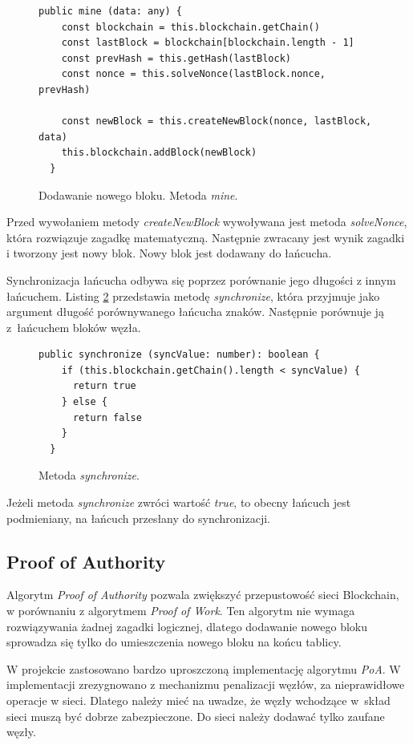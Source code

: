 \documentclass[a4paper,12pt]{book}
\begin{document}
\begin{figure}[H]  
  \centering
\begin{lstlisting}[style=ES6]
  public mine (data: any) {
    const blockchain = this.blockchain.getChain()
    const lastBlock = blockchain[blockchain.length - 1]
    const prevHash = this.getHash(lastBlock)
    const nonce = this.solveNonce(lastBlock.nonce, prevHash)

    const newBlock = this.createNewBlock(nonce, lastBlock, data)
    this.blockchain.addBlock(newBlock)
  }
\end{lstlisting}
\caption{Dodawanie nowego bloku. Metoda \textit{mine}.}
\label{mine}
\end{figure}
Przed wywołaniem metody \textit{createNewBlock} wywoływana jest metoda \textit{solveNonce}, która rozwiązuje zagadkę matematyczną. Następnie zwracany jest wynik zagadki i tworzony jest nowy blok. Nowy blok jest dodawany do łańcucha.

Synchronizacja łańcucha odbywa się poprzez porównanie jego długości z innym łańcuchem. Listing \ref{synchronize} przedstawia metodę \textit{synchronize}, która przyjmuje jako argument długość porównywanego łańcucha znaków. Następnie porównuje ją z~łańcuchem bloków węzła.

\begin{figure}[H]  
  \centering
\begin{lstlisting}[style=ES6]
  public synchronize (syncValue: number): boolean {
    if (this.blockchain.getChain().length < syncValue) {
      return true
    } else {
      return false
    }
  }
\end{lstlisting}
\caption{Metoda \textit{synchronize}.}
\label{synchronize}
\end{figure}
Jeżeli metoda \textit{synchronize} zwróci wartość \textit{true}, to obecny łańcuch jest podmieniany, na łańcuch przesłany do synchronizacji.
 
\subsection{Proof of Authority}
Algorytm \textit{Proof of Authority} pozwala zwiększyć przepustowość sieci Blockchain, w porównaniu z algorytmem \textit{Proof of Work}. Ten algorytm nie wymaga rozwiązywania żadnej zagadki logicznej, dlatego dodawanie nowego bloku sprowadza się tylko do umieszczenia nowego bloku na końcu tablicy. 
 
W projekcie zastosowano bardzo uproszczoną implementację algorytmu \textit{PoA}. W implementacji zrezygnowano z mechanizmu penalizacji węzłów, za nieprawidłowe operacje w sieci. Dlatego należy mieć na uwadze, że węzły wchodzące w~skład sieci muszą być dobrze zabezpieczone. Do sieci należy dodawać tylko zaufane węzły.
 
\end{document}
